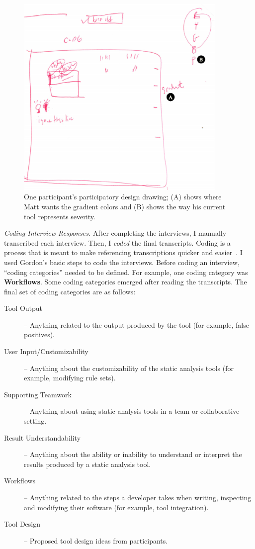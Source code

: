 \documentclass{llncs}
\begin{document}
\begin{figure} [h]
	\centering
	\includegraphics[width=4in]{figs/participatory.pdf}
	\caption{One participant's participatory design drawing; (A) shows where Matt wants the gradient colors and (B) shows the way his current tool represents severity.}
	\label{fig:drawing}
\end{figure}

\vspace{0.5em}
\noindent\textit{Coding Interview Responses.}
After completing the interviews, I manually transcribed each interview. Then, I \textit{coded} the final transcripts. Coding is a process that is meant to make referencing transcriptions quicker and
easier~\cite{Gordon:1998:Coding}. I used Gordon's basic steps to code the interviews. Before coding an interview, ``coding categories'' needed to be defined. For example, one coding category was \textbf{Workflows}. 
Some coding categories emerged after reading the transcripts.
The final set of coding categories are as follows: 

\begin{description}
	\item[Tool Output] -- Anything related to the output produced by the tool (for example, false positives). 
	\item[User Input/Customizability] -- Anything about the customizability of the static analysis tools (for example, modifying rule sets). 
	\item[Supporting Teamwork] -- Anything about using static analysis tools in a team or collaborative setting. 
	\item[Result Understandability] -- Anything about the ability or inability to understand or interpret the results produced by a static analysis tool.
	\item[Workflows] -- Anything related to the steps a developer takes when writing, inspecting and modifying their software (for example, tool integration).
	\item[Tool Design] -- Proposed tool design ideas from participants.
\end{description}
\end{document}
